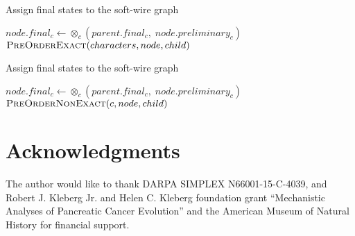 \documentclass[12pt]{article}
\begin{document}
{\begin{algorithm}
\begin{algorithmic}[1]
		\EndFor
		\EndFunction
	\end{algorithmic}
\end{algorithm}


\begin{algorithm}
	\caption{Assign final states to the soft-wire graph}
	\label{Alg:pre-order-traversal}
	\begin{algorithmic}[1]
		    \State $node.final_c \gets \otimes_c \left( parent.final_c,\; node.preliminary_c \right)$
		  \EndFor
		    \State $\Call{PreOrderExact}{characters, node, child}$
		  \EndFor
		\EndFunction
\end{algorithmic}
\end{algorithm}


\begin{algorithm}
	\caption{Assign final states to the soft-wire graph}
	\label{Alg:pre-order-traversal}
	\begin{algorithmic}[1]
		\State $node.final_c \gets \otimes_c \left( parent.final_c,\; node.preliminary_c \right)$
		  \State $\Call{PreOrderNonExact}{c, node, child}$
		\EndFor
		\EndFunction
	\end{algorithmic}
\end{algorithm}

\restoregeometry
}


\section*{Acknowledgments}
The author would like to thank DARPA SIMPLEX N66001-15-C-4039, and Robert J. Kleberg Jr. and Helen C. Kleberg foundation grant ``Mechanistic Analyses of Pancreatic Cancer Evolution'' and the American Museum of Natural History for financial support. 

%
%
\newpage
%

%
\end{document}
